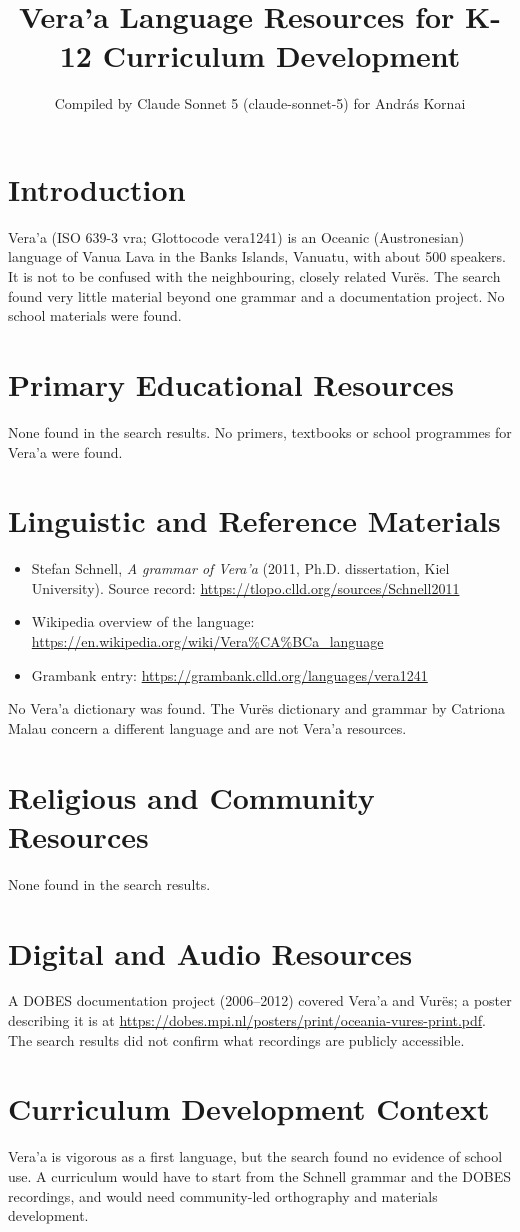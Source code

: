 \documentclass[12pt]{article}
\title{Vera'a Language Resources for K-12 Curriculum Development}
\author{Compiled by Claude Sonnet 5 (claude-sonnet-5) for Andr\'as Kornai}
\date{}
\begin{document}
\maketitle
\section{Introduction}
Vera'a (ISO 639-3 vra; Glottocode vera1241) is an Oceanic (Austronesian) language of Vanua Lava in the Banks Islands, Vanuatu, with about 500 speakers. It is not to be confused with the neighbouring, closely related Vur\"es. The search found very little material beyond one grammar and a documentation project. No school materials were found.
\section{Primary Educational Resources}
None found in the search results. No primers, textbooks or school programmes for Vera'a were found.
\section{Linguistic and Reference Materials}
\begin{itemize}
\item Stefan Schnell, \emph{A grammar of Vera'a} (2011, Ph.D. dissertation, Kiel University). Source record: \url{https://tlopo.clld.org/sources/Schnell2011}
\item Wikipedia overview of the language: \url{https://en.wikipedia.org/wiki/Vera%CA%BCa_language}
\item Grambank entry: \url{https://grambank.clld.org/languages/vera1241}
\end{itemize}
No Vera'a dictionary was found. The Vur\"es dictionary and grammar by Catriona Malau concern a different language and are not Vera'a resources.
\section{Religious and Community Resources}
None found in the search results.
\section{Digital and Audio Resources}
A DOBES documentation project (2006--2012) covered Vera'a and Vur\"es; a poster describing it is at \url{https://dobes.mpi.nl/posters/print/oceania-vures-print.pdf}. The search results did not confirm what recordings are publicly accessible.
\section{Curriculum Development Context}
Vera'a is vigorous as a first language, but the search found no evidence of school use. A curriculum would have to start from the Schnell grammar and the DOBES recordings, and would need community-led orthography and materials development.
\end{document}
